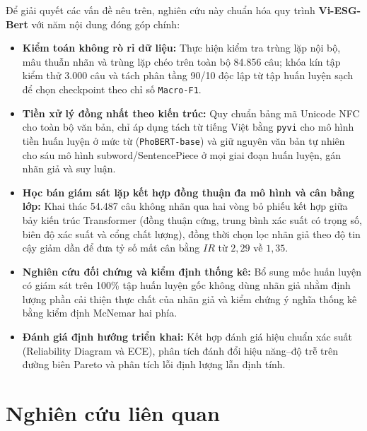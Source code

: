 \documentclass[journal,a4paper]{IEEEtran}
\newcommand{\code}[1]{\texttt{\small #1}}
\begin{document}
Để giải quyết các vấn đề nêu trên, nghiên cứu này chuẩn hóa quy trình \textbf{Vi-ESG-Bert} với năm nội dung đóng góp chính:
\begin{itemize}[leftmargin=*, itemsep=2pt, topsep=2pt]
  \item \textbf{Kiểm toán không rò rỉ dữ liệu:} Thực hiện kiểm tra trùng lặp nội bộ, mâu thuẫn nhãn và trùng lặp chéo trên toàn bộ 84.856 câu; khóa kín tập kiểm thử 3.000 câu và tách phân tầng 90/10 độc lập từ tập huấn luyện sạch để chọn checkpoint theo chỉ số \code{Macro-F1}.
  \item \textbf{Tiền xử lý đồng nhất theo kiến trúc:} Quy chuẩn bảng mã Unicode NFC cho toàn bộ văn bản, chỉ áp dụng tách từ tiếng Việt bằng \code{pyvi} cho mô hình tiền huấn luyện ở mức từ (\code{PhoBERT-base}) và giữ nguyên văn bản tự nhiên cho sáu mô hình subword/SentencePiece ở mọi giai đoạn huấn luyện, gán nhãn giả và suy luận.
  \item \textbf{Học bán giám sát lặp kết hợp đồng thuận đa mô hình và cân bằng lớp:} Khai thác 54.487 câu không nhãn qua hai vòng bỏ phiếu kết hợp giữa bảy kiến trúc Transformer (đồng thuận cứng, trung bình xác suất có trọng số, biên độ xác suất và cổng chất lượng), đồng thời chọn lọc nhãn giả theo độ tin cậy giảm dần để đưa tỷ số mất cân bằng $IR$ từ $2{,}29$ về $1{,}35$.
  \item \textbf{Nghiên cứu đối chứng và kiểm định thống kê:} Bổ sung mốc huấn luyện có giám sát trên 100\% tập huấn luyện gốc không dùng nhãn giả nhằm định lượng phần cải thiện thực chất của nhãn giả và kiểm chứng ý nghĩa thống kê bằng kiểm định McNemar hai phía.
  \item \textbf{Đánh giá định hướng triển khai:} Kết hợp đánh giá hiệu chuẩn xác suất (Reliability Diagram và ECE), phân tích đánh đổi hiệu năng--độ trễ trên đường biên Pareto và phân tích lỗi định lượng lẫn định tính.
\end{itemize}

\section{Nghiên cứu liên quan}
\label{sec:related}
\end{document}
